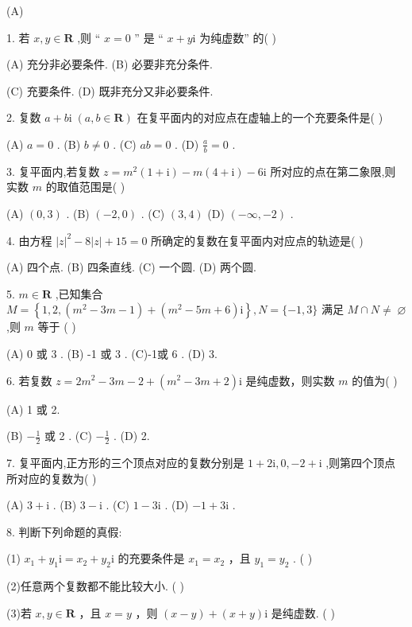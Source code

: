\documentclass[10pt]{article}
\begin{document}
(A)

1. 若 \(x,y \in  \mathbf{R}\) ,则 “ \(x = 0\) ” 是 “ \(x + y\mathrm{i}\) 为纯虚数” 的( )

(A) 充分非必要条件. (B) 必要非充分条件.

(C) 充要条件. (D) 既非充分又非必要条件.

2. 复数 \(a + b\mathrm{i}\;\left( {a,b \in  \mathbf{R}}\right)\) 在复平面内的对应点在虚轴上的一个充要条件是( )

(A) \(a = 0\) . (B) \(b \neq  0\) . (C) \({ab} = 0\) . (D) \(\frac{a}{b} = 0\) .

3. 复平面内,若复数 \(z = {m}^{2}\left( {1 + \mathrm{i}}\right)  - m\left( {4 + \mathrm{i}}\right)  - 6\mathrm{i}\) 所对应的点在第二象限,则实数 \(m\) 的取值范围是( )

(A) \(\left( {0,3}\right)\) . (B) \(\left( {-2,0}\right)\) . (C) \(\left( {3,4}\right)\) (D) \(\left( {-\infty , - 2}\right)\) .

4. 由方程 \({\left| z\right| }^{2} - 8\left| z\right|  + {15} = 0\) 所确定的复数在复平面内对应点的轨迹是( )

(A) 四个点. (B) 四条直线. (C) 一个圆. (D) 两个圆.

5. \(m \in  \mathbf{R}\) ,已知集合 \(M = \left\{  {1,2,\left( {{m}^{2} - {3m} - 1}\right)  + \left( {{m}^{2} - {5m} + 6}\right) \mathrm{i}}\right\}  ,N = \{  - 1,3\}\) 满足 \(M \cap  N \neq \; \varnothing\) ,则 \(m\) 等于 ( )

(A) 0 或 3 . (B) -1 或 3 . (C)-1或 6 . (D) 3.

6. 若复数 \(z = 2{m}^{2} - {3m} - 2 + \left( {{m}^{2} - {3m} + 2}\right) \mathrm{i}\) 是纯虚数，则实数 \(m\) 的值为( )

(A) 1 或 2.

(B) \(- \frac{1}{2}\) 或 2 . (C) \(- \frac{1}{2}\) . (D) 2.

7. 复平面内,正方形的三个顶点对应的复数分别是 \(1 + 2\mathrm{i},0, - 2 + \mathrm{i}\) ,则第四个顶点所对应的复数为( )

(A) \(3 + \mathrm{i}\) . (B) \(3 - \mathrm{i}\) . (C) \(1 - 3\mathrm{i}\) . (D) \(- 1 + 3\mathrm{i}\) .

8. 判断下列命题的真假:

(1) \({x}_{1} + {y}_{1}\mathrm{i} = {x}_{2} + {y}_{2}\mathrm{i}\) 的充要条件是 \({x}_{1} = {x}_{2}\) ，且 \({y}_{1} = {y}_{2}\) . ( )

(2)任意两个复数都不能比较大小. ( )

(3)若 \(x,y \in  \mathbf{R}\) ，且 \(x = y\) ，则 \(\left( {x - y}\right)  + \left( {x + y}\right) \mathrm{i}\) 是纯虚数. ( )
\end{document}
